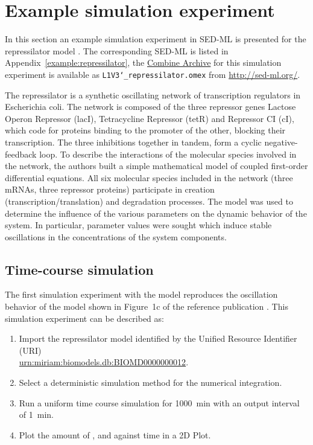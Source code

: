 \section{Example simulation experiment}
\label{motivation:example}
In this section an example simulation experiment in SED-ML is presented for the repressilator model \citep{Elowitz:2000}. The corresponding SED-ML is listed in Appendix~\ref{example:repressilator}, the \hyperref[sec:archive]{Combine Archive} for this simulation experiment is available as \texttt{L1V3\char`_repressilator.omex} from \url{http://sed-ml.org/}.

The repressilator is a synthetic oscillating network of transcription regulators in Escherichia coli. The network is composed of the three repressor genes Lactose Operon Repressor (lacI), Tetracycline Repressor (tetR) and Repressor CI (cI), which code for proteins binding to the promoter of the other, blocking their transcription. The three inhibitions together in tandem, form a cyclic negative-feedback loop. To describe the interactions of the molecular species involved in the network, the authors built a simple mathematical model of coupled first-order differential equations. All six molecular species included in the network (three mRNAs, three repressor proteins) participate in creation (transcription/translation) and degradation processes. The model was used to determine the influence of the various parameters on the dynamic behavior of the system. In particular, parameter values were sought which induce stable oscillations in the concentrations of the system components.

\subsection{Time-course simulation}
\label{sec:timecourse}
The first simulation experiment with the model reproduces the oscillation behavior of the model shown in Figure~1c of the reference publication \citep{Elowitz:2000}. This simulation experiment can be described as:

\begin{enumerate}
 	\item{Import the repressilator model identified by the Unified Resource Identifier (URI) \citep{Berners-Lee:2005}\\ 	\url{urn:miriam:biomodels.db:BIOMD0000000012}.}
 	\item {Select a deterministic simulation method for the numerical integration.}
 	\item{Run a uniform time course simulation for 1000~min with an output interval of 1~min.}
 	\item{Plot the amount of ,  and  against time in a 2D Plot.}
 \end{enumerate}

